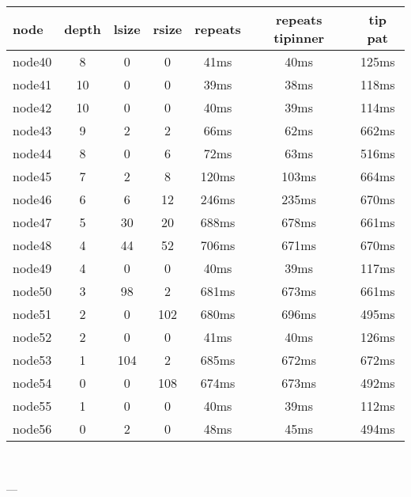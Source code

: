 \begin{tabular}{|l|c|c|c|c|c|c|}
\hline node & depth & lsize & rsize  & repeats & repeats tipinner & tip pat\\
    \hline node40 & 8 & 0 & 0 & 41ms & 40ms & 125ms\\
    \hline node41 & 10 & 0 & 0 & 39ms & 38ms & 118ms\\
    \hline node42 & 10 & 0 & 0 & 40ms & 39ms & 114ms\\
    \hline node43 & 9 & 2 & 2 & 66ms & 62ms & 662ms\\
    \hline node44 & 8 & 0 & 6 & 72ms & 63ms & 516ms\\
    \hline node45 & 7 & 2 & 8 & 120ms & 103ms & 664ms\\
    \hline node46 & 6 & 6 & 12 & 246ms & 235ms & 670ms\\
    \hline node47 & 5 & 30 & 20 & 688ms & 678ms & 661ms\\
    \hline node48 & 4 & 44 & 52 & 706ms & 671ms & 670ms\\
    \hline node49 & 4 & 0 & 0 & 40ms & 39ms & 117ms\\
    \hline node50 & 3 & 98 & 2 & 681ms & 673ms & 661ms\\
    \hline node51 & 2 & 0 & 102 & 680ms & 696ms & 495ms\\
    \hline node52 & 2 & 0 & 0 & 41ms & 40ms & 126ms\\
    \hline node53 & 1 & 104 & 2 & 685ms & 672ms & 672ms\\
    \hline node54 & 0 & 0 & 108 & 674ms & 673ms & 492ms\\
    \hline node55 & 1 & 0 & 0 & 40ms & 39ms & 112ms\\
    \hline node56 & 0 & 2 & 0 & 48ms & 45ms & 494ms\\

\hline
\end{tabular} \

---


